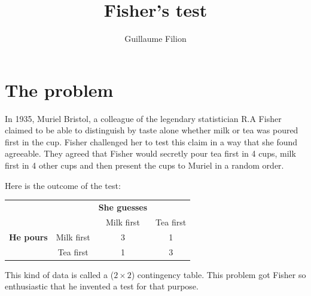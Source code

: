 \documentclass[a4paper]{article}
\title{Fisher's test}
\author{Guillaume Filion}
\theoremstyle{definition}
\begin{document}
\maketitle


\section{The problem}

In 1935, Muriel Bristol, a colleague of the legendary statistician
R.A Fisher claimed to be able to distinguish by taste alone
whether milk or tea was poured first in the cup. Fisher challenged her
to test this claim in a way that she found agreeable. They
agreed that Fisher would secretly pour tea first in 4 cups, milk first
in 4 other cups and then present the cups to Muriel in a random order.

Here is the outcome of the test:

\begin{center}
  \begin{tabular}{cccc}
    && \textbf{She guesses} & \\\cline{2-4}
    && Milk first & Tea first \\
    \textbf{He pours} & Milk first & 3 & 1 \\
    & Tea first  & 1 & 3 \\
  \end{tabular}
\end{center}

This kind of data is called a ($2\times 2$) contingency table.
This problem got Fisher so enthusiastic that he invented a test
for that purpose.
\end{document}
